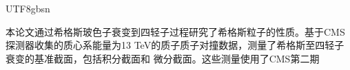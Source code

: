 \begin{CJK}{UTF8}{gbsn}
\par	本论文通过希格斯玻色子衰变到四轻子过程研究了希格斯粒子的性质。基于CMS探测器收集的质心系能量为13 TeV的质子质子对撞数据，测量了希格斯至四轻子衰变的基准截面，包括积分截面和
    微分截面。这些测量使用了CMS第二期
%	
%	
%	
%	
%	
%	
%	
%	
%	
%	
%	
%	
%	
%	
%	
%	
%	
%	
%	
%	
%	
%	
\end{CJK}
